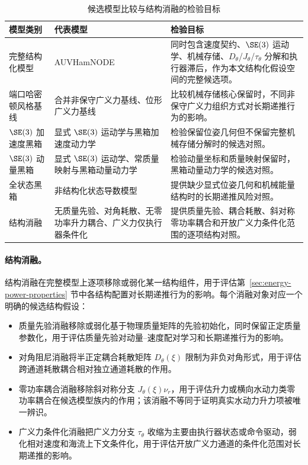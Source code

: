 \begin{table}[htbp]
  \centering
  \caption{候选模型比较与结构消融的检验目标}
  \label{tab:model-comparison-roles}
  \begin{tabularx}{\textwidth}{>{\raggedright\arraybackslash}p{}>{\raggedright\arraybackslash}p{}>{\raggedright\arraybackslash}X}
    \toprule
    模型类别 & 代表模型 & 检验目标 \\
    \midrule
    完整结构化模型 & AUVHamNODE & 同时包含速度契约、\(\SE(3)\) 运动学、机械存储、\(D_\theta\)/\(J_\theta\)/\(\tau_\theta\) 分解和执行器滞后，作为本文结构化假设空间的完整候选项。 \\
    端口哈密顿风格基线 & 合并非保守广义力基线、位形广义力基线 & 比较机械存储核心保留时，不同非保守广义力组织方式对长期递推行为的影响。 \\
    \(\SE(3)\) 加速度黑箱 & 显式 \(\SE(3)\) 运动学与黑箱加速度动力学 & 检验保留位姿几何但不保留完整机械存储分解时的候选对照。 \\
    \(\SE(3)\) 动量黑箱 & 显式 \(\SE(3)\) 运动学、常质量映射与黑箱动量动力学 & 检验动量坐标和质量映射保留时，黑箱动量动力学的候选对照。 \\
    全状态黑箱 & 非结构化状态导数模型 & 提供缺少显式位姿几何和机械能量结构时的长期递推风险对照。 \\
    结构消融 & 无质量先验、对角耗散、无零功率升力耦合、广义力仅执行器条件化 & 提供质量先验、耦合耗散、斜对称零功率耦合和开放广义力条件化范围的逐项结构对照。 \\
    \bottomrule
  \end{tabularx}
\end{table}

\paragraph{结构消融。}结构消融在完整模型上逐项移除或弱化某一结构组件，用于评估第~\ref{sec:energy-power-properties} 节中各结构配置对长期递推行为的影响。每个消融对象对应一个明确的候选结构假设：

\begin{itemize}
  \item 质量先验消融移除或弱化基于物理质量矩阵的先验初始化，同时保留正定质量参数化，用于评估质量先验对动量--速度配对学习和长期递推行为的影响。
  \item 对角阻尼消融将半正定耦合耗散矩阵 \(D_\theta(\xi)\) 限制为非负对角形式，用于评估跨通道耗散耦合相对独立通道耗散的作用。
  \item 零功率耦合消融移除斜对称分支 \(J_\theta(\xi)\nu_r\)，用于评估升力或横向水动力类零功率耦合在候选模型族内的作用；该消融不等同于证明真实水动力升力项被唯一辨识。
  \item 广义力条件化消融把广义力分支 \(\tau_\theta\) 收缩为主要由执行器状态或命令驱动，弱化相对速度和海流上下文条件化，用于评估开放广义力通道的条件化范围对长期递推的影响。
\end{itemize}

